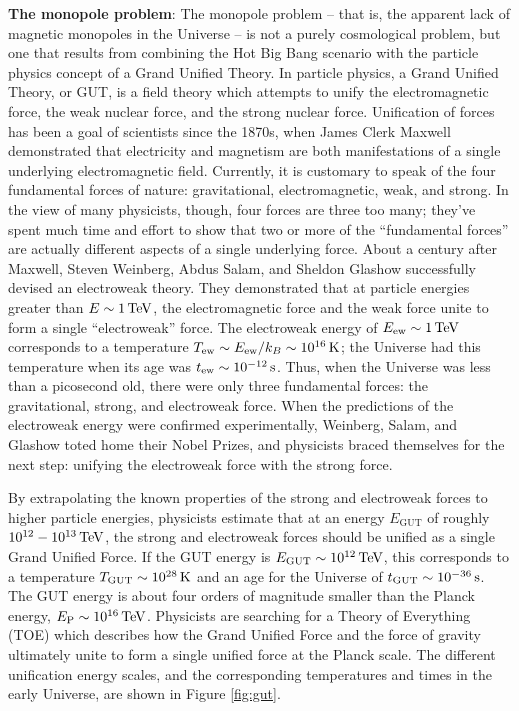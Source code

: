 \documentclass[a4paper,11pt]{article}
\begin{document}
{\noindent}\textbf{The monopole problem}: The monopole problem -- that is, the apparent lack of magnetic monopoles in the Universe -- is not a purely cosmological problem, but one that results from combining the Hot Big Bang scenario with the particle physics concept of a Grand Unified Theory. In particle physics, a Grand Unified Theory, or GUT, is a field theory which attempts to unify the electromagnetic force, the weak nuclear force, and the strong nuclear force. Unification of forces has been a goal of scientists since the 1870s, when James Clerk Maxwell demonstrated that electricity and magnetism are both manifestations of a single underlying electromagnetic field. Currently, it is customary to speak of the four fundamental forces of nature: gravitational, electromagnetic, weak, and strong. In the view of many physicists, though, four forces are three too many; they've spent much time and effort to show that two or more of the ``fundamental forces'' are actually different aspects of a single underlying force. About a century after Maxwell, Steven Weinberg, Abdus Salam, and Sheldon Glashow successfully devised an electroweak theory. They demonstrated that at particle energies greater than $E\sim1\,{\rm TeV}$, the electromagnetic force and the weak force unite to form a single ``electroweak'' force. The electroweak energy of $E_\mathrm{ew}\sim1\,{\rm TeV}$ corresponds to a temperature $T_\mathrm{ew}\sim E_\mathrm{ew}/k_B\sim10^{16}\,{\rm K}$; the Universe had this temperature when its age was $t_\mathrm{ew}\sim10^{-12}\,{\rm s}$. Thus, when the Universe was less than a picosecond old, there were only three fundamental forces: the gravitational, strong, and electroweak force. When the predictions of the electroweak energy were confirmed experimentally, Weinberg, Salam, and Glashow toted home their Nobel Prizes, and physicists braced themselves for the next step: unifying the electroweak force with the strong force.

{\noindent}By extrapolating the known properties of the strong and electroweak forces to higher particle energies, physicists estimate that at an energy $E_\mathrm{GUT}$ of roughly $10^{12}-10^{13}\,{\rm TeV}$, the strong and electroweak forces should be unified as a single Grand Unified Force. If the GUT energy is $E_\mathrm{GUT}\sim10^{12}\,{\rm TeV}$, this corresponds to a temperature $T_\mathrm{GUT}\sim10^{28}\,{\rm K}$ and an age for the Universe of $t_\mathrm{GUT}\sim10^{-36}\,{\rm s}$. The GUT energy is about four orders of magnitude smaller than the Planck energy, $E_\mathrm{P}\sim10^{16}\,{\rm TeV}$. Physicists are searching for a Theory of Everything (TOE) which describes how the Grand Unified Force and the force of gravity ultimately unite to form a single unified force at the Planck scale. The different unification energy scales, and the corresponding temperatures and times in the early Universe, are shown in Figure \ref{fig:gut}.
\end{document}
